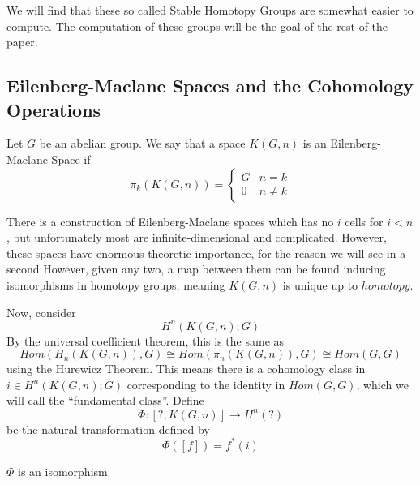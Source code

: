 We will find that these so called Stable Homotopy Groups are somewhat easier to compute.  
The computation of these groups will be the goal of the rest of the paper.  


\subsection{Eilenberg-Maclane Spaces and the Cohomology Operations}

\begin{Def}
  Let $G$ be an abelian group.  We say that a space $K(G,n)$ is an Eilenberg-Maclane Space if
  \[\pi_k(K(G,n))=\left\{\begin{array}{cc} G & n=k \\ 0 & n\ne k\end{array}\right.\]
\end{Def}
There is a construction of Eilenberg-Maclane spaces which has no $i$ cells for $i<n$, but unfortunately most are infinite-dimensional and complicated.  However, these spaces have enormous theoretic importance, for the reason we will see in a second  However, given any two, a map between them can be found inducing isomorphisms in homotopy groups, meaning $K(G,n)$ is unique up to $homotopy$. 

Now, consider 
\[H^n(K(G,n);G)\]
By the universal coefficient theorem, this is the same as
\[Hom(H_n(K(G,n)),G)\cong Hom(\pi_n(K(G,n)),G)\cong Hom(G,G)\]
using the Hurewicz Theorem.  
This means there is a cohomology class in $i\in H^n(K(G,n);G)$ corresponding to the identity in $Hom(G,G)$, which we will call the ``fundamental class''.  
Define
\[\Phi:[?,K(G,n)]\to H^n(?)\]
be the natural transformation defined by
\[\Phi([f]) = f^*(i)\]

\begin{Theorem}
  $\Phi$ is an isomorphism
\end{Theorem}


